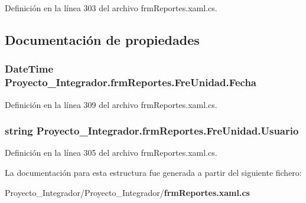 Definición en la línea 303 del archivo frm\-Reportes.\-xaml.\-cs.



\subsection{Documentación de propiedades}
\subsubsection[{Fecha}]{\setlength{\rightskip}{0pt plus 5cm}Date\-Time Proyecto\-\_\-\-Integrador.\-frm\-Reportes.\-Fre\-Unidad.\-Fecha\hspace{0.3cm}{\ttfamily [get]}}\label{struct_proyecto___integrador_1_1frm_reportes_1_1_fre_unidad_ae2aa8e98d9307af363d788577130a146}


Definición en la línea 309 del archivo frm\-Reportes.\-xaml.\-cs.

\subsubsection[{Usuario}]{\setlength{\rightskip}{0pt plus 5cm}string Proyecto\-\_\-\-Integrador.\-frm\-Reportes.\-Fre\-Unidad.\-Usuario\hspace{0.3cm}{\ttfamily [get]}}\label{struct_proyecto___integrador_1_1frm_reportes_1_1_fre_unidad_a7a57cc6d34969dda221439bf23f3c13d}


Definición en la línea 305 del archivo frm\-Reportes.\-xaml.\-cs.



La documentación para esta estructura fue generada a partir del siguiente fichero\-:\begin{DoxyCompactItemize}
\item 
Proyecto\-\_\-\-Integrador/\-Proyecto\-\_\-\-Integrador/{\bf frm\-Reportes.\-xaml.\-cs}\end{DoxyCompactItemize}

